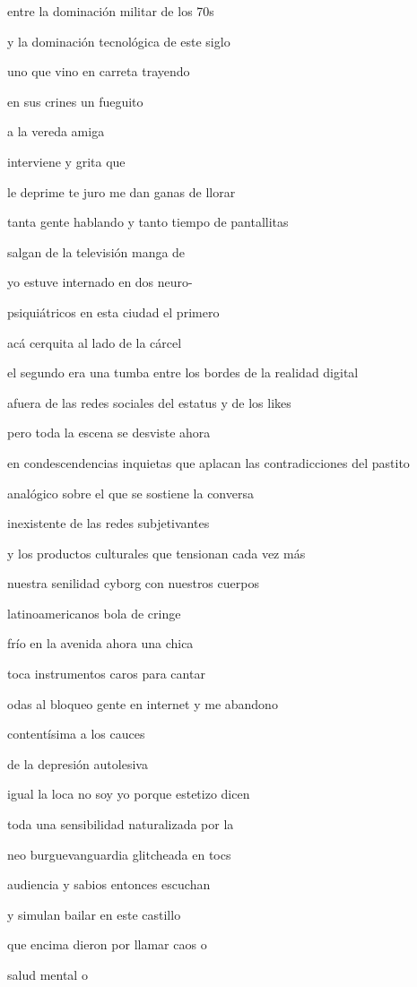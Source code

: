 \documentclass[
]{book}
\begin{document}
entre la dominación militar de los 70s

y la dominación tecnológica de este siglo

uno que vino en carreta trayendo

en sus crines un fueguito

a la vereda amiga

interviene y grita que

le deprime te juro me dan ganas de llorar

tanta gente hablando y tanto tiempo de pantallitas

salgan de la televisión manga de

yo estuve internado en dos neuro-

psiquiátricos en esta ciudad el primero

acá cerquita al lado de la cárcel

el segundo era una tumba entre los bordes de la realidad digital

afuera de las redes sociales del estatus y de los likes

pero toda la escena se desviste ahora

en condescendencias inquietas que aplacan las contradicciones del pastito

analógico sobre el que se sostiene la conversa

inexistente de las redes subjetivantes

y los productos culturales que tensionan cada vez más

nuestra senilidad cyborg con nuestros cuerpos

latinoamericanos bola de cringe

frío en la avenida ahora una chica

toca instrumentos caros para cantar

odas al bloqueo gente en internet y me abandono

contentísima a los cauces

de la depresión autolesiva

igual la loca no soy yo porque estetizo dicen

toda una sensibilidad naturalizada por la

neo burguevanguardia glitcheada en tocs

audiencia y sabios entonces escuchan

y simulan bailar en este castillo

que encima dieron por llamar caos o

salud mental o
\end{document}
